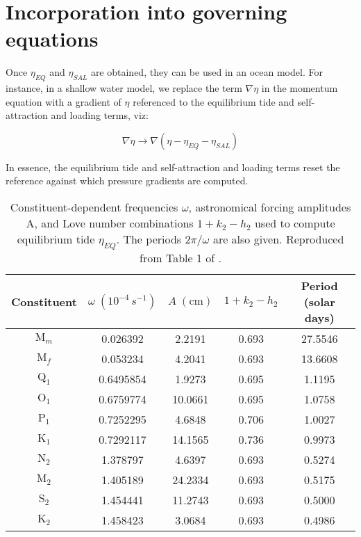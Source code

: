 \documentclass[11pt]{report}
\begin{document}
\section{Incorporation into governing equations}
\label{sec:goverining_eqns}

Once $\eta_{EQ}$ and $\eta_{SAL}$ are obtained, they can be used in an ocean model.  For instance, in a shallow water model, we replace the term $\nabla \eta$ in the momentum equation with a gradient of $\eta$ referenced to the equilibrium tide and self-attraction and loading terms, viz:

\begin{equation}
    \nabla\eta \rightarrow \nabla\left( \eta - \eta_{EQ} - \eta_{SAL}\right)
\end{equation}

In essence, the equilibrium tide and self-attraction and loading terms reset the reference against which pressure gradients are computed.


\begin{table}
\begin{center}
\begin{tabular}{|c|c|c|c|c|}
\hline 
Constituent & $\omega\;\left(10^{-4}\,s^{-1}\right)$ & $A\;\left(\textrm{cm}\right)$ & $1+k_{2}-h_{2}$ & Period (solar days)\tabularnewline
\hline 
\hline 
$\textrm{M}_{m}$ & 0.026392 & 2.2191 & 0.693 & 27.5546\tabularnewline
\hline 
$\textrm{M}_{f}$ & 0.053234 & 4.2041 & 0.693 & 13.6608\tabularnewline
\hline 
$\textrm{Q}_{1}$ & 0.6495854 & 1.9273 & 0.695 & 1.1195\tabularnewline
\hline 
$\textrm{O}_{1}$ & 0.6759774 & 10.0661 & 0.695 & 1.0758\tabularnewline
\hline 
$\textrm{P}_{1}$ & 0.7252295 & 4.6848 & 0.706 & 1.0027\tabularnewline
\hline 
$\textrm{K}_{1}$ & 0.7292117 & 14.1565 & 0.736 & 0.9973\tabularnewline
\hline 
$\textrm{N}_{2}$ & 1.378797 & 4.6397 & 0.693 & 0.5274\tabularnewline
\hline 
$\textrm{M}_{2}$ & 1.405189 & 24.2334 & 0.693 & 0.5175\tabularnewline
\hline 
$\textrm{S}_{2}$ & 1.454441 & 11.2743 & 0.693 & 0.5000\tabularnewline
\hline 
$\textrm{K}_{2}$ & 1.458423 & 3.0684 & 0.693 & 0.4986\tabularnewline
\hline 
\end{tabular}
\label{tab:astronimcalFactors}
\caption{Constituent-dependent frequencies $\omega$, astronomical forcing amplitudes A, and Love number combinations $1 + k_2 - h_2$ used to compute equilibrium tide $\eta_{EQ}$. The periods $2\pi/\omega$ are also given. Reproduced from Table 1 of \citet{chassignet_primer_2018, arbic2004accuracy}.}
\end{center}
\end{table}
\end{document}
